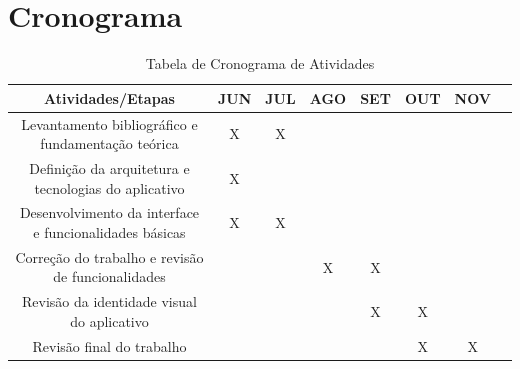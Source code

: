 
\chapter{Cronograma}

\begin{table}[h]
    \centering
    \begin{tabular}{|c|c|c|c|c|c|c|c|}
        \hline
        Atividades/Etapas & JUN & JUL & AGO & SET & OUT & NOV \\
        \hline
        Levantamento bibliográfico e fundamentação teórica & X & X & & & & \\
        \hline
        Definição da arquitetura e tecnologias do aplicativo & X & & & & & \\
        \hline
        Desenvolvimento da interface e funcionalidades básicas & X & X & & & & \\
        \hline
        Correção do trabalho e revisão de funcionalidades & & & X & X & & \\
        \hline
        Revisão da identidade visual do aplicativo & & & & X & X & \\
        \hline
        Revisão final do trabalho & & & & & X & X \\
        \hline
    \end{tabular}
    \caption{Tabela de Cronograma de Atividades}
    \label{tab:cronograma}
\end{table}
